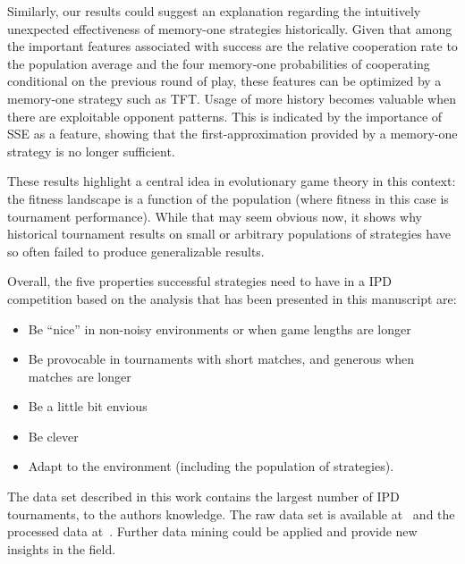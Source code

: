 Similarly, our results could suggest an explanation regarding the intuitively
unexpected effectiveness of memory-one strategies historically. Given that among
the important features associated with success are the relative cooperation rate
to the population average and the four memory-one probabilities of cooperating
conditional on the previous round of play, these features can be optimized by a
memory-one strategy such as TFT. Usage of more history becomes valuable when
there are exploitable opponent patterns. This is indicated by the importance of
SSE as a feature, showing that the first-approximation provided by a memory-one
strategy is no longer sufficient.

These results highlight a central idea in evolutionary game theory in this
context: the fitness landscape is a function of the population (where fitness in
this case is tournament performance). While that may seem obvious now, it shows
why historical tournament results on small or arbitrary populations of
strategies have so often failed to produce generalizable results.

Overall, the five properties successful strategies need to have in a IPD competition
based on the analysis that has been presented in this manuscript are:

\begin{itemize}
    \item Be ``nice'' in non-noisy environments or when game lengths are longer
    \item Be provocable in tournaments with short matches, and generous when matches are longer
    \item Be a little bit envious
    \item Be clever
    \item Adapt to the environment (including the population of strategies).
\end{itemize}

The data set described in this work contains the largest number of IPD tournaments,
to the authors knowledge. The raw data set is available at~\cite{raw_data} and the
processed data at~\cite{data}. Further data mining
could be applied and provide new insights in the field.
